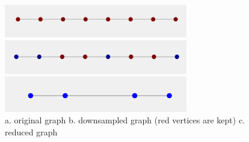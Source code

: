 \documentclass[a4paper]{article}
\begin{document}
\begin{figure}[H]
\centering

\includegraphics[width = 8cm]{path_graph/path_graph}

\includegraphics[width = 8cm]{path_graph/downsample_path_graph}

\includegraphics[width = 8cm]{path_graph/rewire_path_graph}

\caption{a. original graph b. downsampled graph (red vertices are kept) c.  reduced graph}
\end{figure}
\end{document}
